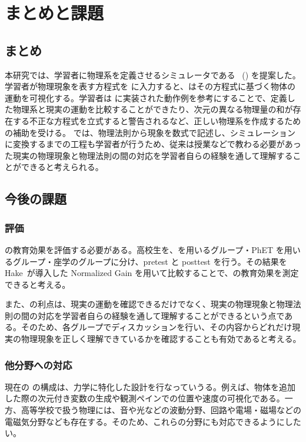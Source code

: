 \chapter{まとめと課題} \label{conclusion}

\section{まとめ}

本研究では、学習者に物理系を定義させるシミュレータである \simname~(\simnamealt) を提案した。
学習者が物理現象を表す方程式を \simname に入力すると、\simname はその方程式に基づく物体の運動を可視化する。学習者は \simname に実装された動作例を参考にすることで、定義した物理系と現実の運動を比較することができたり、次元の異なる物理量の和が存在する不正な方程式を立式すると警告されるなど、正しい物理系を作成するための補助を受ける。
\simname では、物理法則から現象を数式で記述し、シミュレーションに変換するまでの工程も学習者が行うため、従来は授業などで教わる必要があった現実の物理現象と物理法則の間の対応を学習者自らの経験を通して理解することができると考えられる。

\section{今後の課題}

\subsection{評価}

\simname の教育効果を評価する必要がある。高校生を、\simname を用いるグループ・PhET を用いるグループ・座学のグループに分け、pretest と posttest を行う。その結果を Hake~\cite{hake_1998}が導入した Normalized Gain を用いて比較することで、\simname の教育効果を測定できると考える。

また、\simname の利点は、現実の運動を確認できるだけでなく、現実の物理現象と物理法則の間の対応を学習者自らの経験を通して理解することができるという点である。そのため、各グループでディスカッションを行い、その内容からどれだけ現実の物理現象を正しく理解できているかを確認することも有効であると考える。

\subsection{他分野への対応}

現在の \simname の構成は、力学に特化した設計を行なっていうる。例えば、物体を追加した際の次元付き変数の生成や観測ペインでの位置や速度の可視化である。一方、高等学校で扱う物理には、音や光などの波動分野、回路や電場・磁場などの電磁気分野なども存在する。そのため、これらの分野にも対応できるようにしたい。

